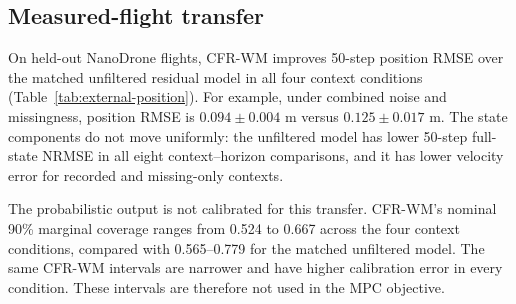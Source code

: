 \subsection{Measured-flight transfer}

On held-out NanoDrone flights, CFR-WM improves 50-step position RMSE over the
matched unfiltered residual model in all four context conditions
(Table~\ref{tab:external-position}). For example, under combined noise and
missingness, position RMSE is $0.094\pm0.004$ m versus
$0.125\pm0.017$ m. The state components do not move uniformly: the unfiltered
model has lower 50-step full-state NRMSE in all eight context--horizon
comparisons, and it has lower velocity error for recorded and missing-only
contexts.

\begin{table}[!t]
  \caption{External 50-step physical errors on three held-out NanoDrone
  flights. Entries are mean $\pm$ SD across five training seeds after equal
  weighting of flights.}
  \label{tab:external-position}
  \centering
  \footnotesize
  
\end{table}

The probabilistic output is not calibrated for this transfer. CFR-WM's nominal
90\% marginal coverage ranges from 0.524 to 0.667 across the four context
conditions, compared with 0.565--0.779 for the matched unfiltered model. The
same CFR-WM intervals are narrower and have higher calibration error in every
condition. These intervals are therefore not used in the MPC objective.
